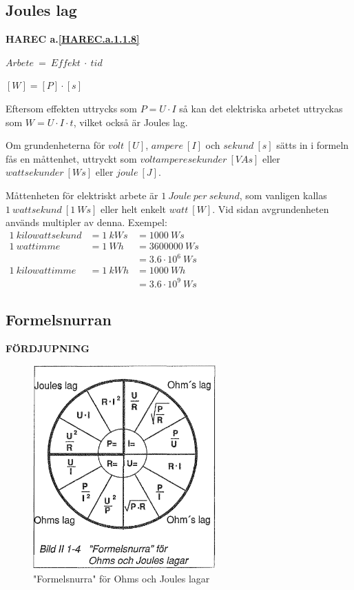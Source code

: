 \subsection{Joules lag}
\textbf{HAREC a.\ref{HAREC.a.1.1.8}\label{myHAREC.a.1.1.8}}

\(Arbete\ =\ Effekt\ \cdot\ tid\)

\([W] = [P] \cdot [s]\)

Eftersom effekten uttrycks som \(P = U \cdot I\) så kan det elektriska arbetet
uttryckas som \(W = U \cdot I \cdot t\), vilket också är Joules lag.

Om grundenheterna för \(volt\ [U]\), \(ampere\ [I]\) och \(sekund\ [s]\) sätts in i
formeln fås en måttenhet, uttryckt som \(voltamperesekunder\ [VAs]\) eller
\(wattsekunder\ [Ws]\) eller \(joule\ [J]\).

Måttenheten för elektriskt arbete är \(1\ Joule\ per\ sekund\), som vanligen kallas
\(1\ wattsekund\ [1\ Ws]\) eller helt enkelt \(watt\ [W]\).
Vid sidan avgrundenheten används multipler
av denna.
Exempel:
\(
\begin{array}{lll}
1\ kilowattsekund & = 1\ kWs & = 1 000\ Ws \\
1\ wattimme & = 1\ Wh & = 3600000\ Ws \\
 & & = 3.6 · 10^6\ Ws \\
1\ kilowattimme & = 1\ kWh & = 1 000\ Wh \\
 & & = 3.6 · 10^9\ Ws
\end{array}
\)

\subsection{Formelsnurran}
\textbf{FÖRDJUPNING}

\begin{figure}
\begin{center}
\includegraphics[width=7cm]{images/bild_2_1-04}
\caption{"Formelsnurra" för Ohms och Joules lagar}
\label{fig:BildII1-4}
\end{center}
\end{figure}

